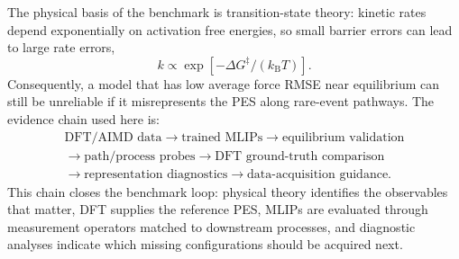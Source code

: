 The physical basis of the benchmark is transition-state theory: kinetic rates depend exponentially on activation free energies, so small barrier errors can lead to large rate errors,
\[
    k \propto \exp[-\Delta G^{\ddagger}/(k_{\mathrm B}T)].
\]
Consequently, a model that has low average force RMSE near equilibrium can still be unreliable if it misrepresents the PES along rare-event pathways. The evidence chain used here is:
\[
\begin{gathered}
\text{DFT/AIMD data}
\rightarrow
\text{trained MLIPs}
\rightarrow
\text{equilibrium validation}\\
\rightarrow
\text{path/process probes}
\rightarrow
\text{DFT ground-truth comparison}\\
\rightarrow
\text{representation diagnostics}
\rightarrow
\text{data-acquisition guidance}.
\end{gathered}
\]
This chain closes the benchmark loop: physical theory identifies the observables that matter, DFT supplies the reference PES, MLIPs are evaluated through measurement operators matched to downstream processes, and diagnostic analyses indicate which missing configurations should be acquired next.
